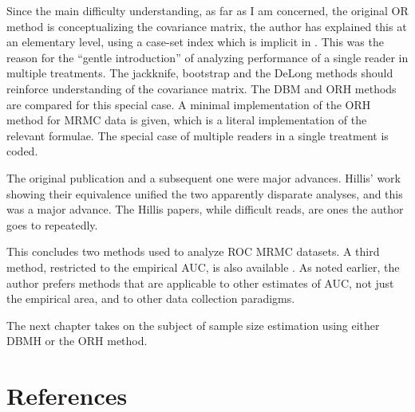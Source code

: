 \documentclass[
]{book}
\begin{document}
Since the main difficulty understanding, as far as I am concerned, the original OR method is conceptualizing the covariance matrix, the author has explained this at an elementary level, using a case-set index which is implicit in \citep{RN1450}. This was the reason for the ``gentle introduction'' of analyzing performance of a single reader in multiple treatments. The jackknife, bootstrap and the DeLong methods should reinforce understanding of the covariance matrix. The DBM and ORH methods are compared for this special case. A minimal implementation of the ORH method for MRMC data is given, which is a literal implementation of the relevant formulae. The special case of multiple readers in a single treatment is coded.

The original publication \citep{RN204} and a subsequent one \citep{RN1450} were major advances. Hillis' work showing their equivalence unified the two apparently disparate analyses, and this was a major advance. The Hillis papers, while difficult reads, are ones the author goes to repeatedly.

This concludes two methods used to analyze ROC MRMC datasets. A third method, restricted to the empirical AUC, is also available \citep{RN2253, RN2254, RN2080, RN2081}. As noted earlier, the author prefers methods that are applicable to other estimates of AUC, not just the empirical area, and to other data collection paradigms.

The next chapter takes on the subject of sample size estimation using either DBMH or the ORH method.

\hypertarget{references-2}{%
\section{References}\label{references-2}}

  
\end{document}
